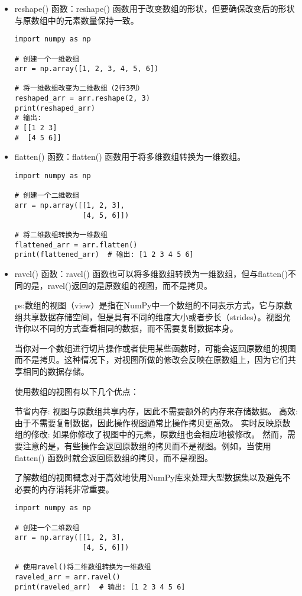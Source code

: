 \documentclass{article}
\begin{document}
\begin{itemize}
    


    \item  reshape() 函数：reshape() 函数用于改变数组的形状，但要确保改变后的形状与原数组中的元素数量保持一致。
\begin{lstlisting}[caption={示例Python代码}]
import numpy as np

# 创建一个一维数组
arr = np.array([1, 2, 3, 4, 5, 6])

# 将一维数组改变为二维数组（2行3列）
reshaped_arr = arr.reshape(2, 3)
print(reshaped_arr)
# 输出:
# [[1 2 3]
#  [4 5 6]]
\end{lstlisting}
\item  flatten() 函数：flatten() 函数用于将多维数组转换为一维数组。
\begin{lstlisting}[caption={示例Python代码}]
import numpy as np

# 创建一个二维数组
arr = np.array([[1, 2, 3],
                [4, 5, 6]])

# 将二维数组转换为一维数组
flattened_arr = arr.flatten()
print(flattened_arr)  # 输出: [1 2 3 4 5 6]
\end{lstlisting}
\item ravel() 函数：ravel() 函数也可以将多维数组转换为一维数组，但与flatten()不同的是，ravel()返回的是原数组的视图，而不是拷贝。
\par ps:数组的视图（view）是指在NumPy中一个数组的不同表示方式，它与原数组共享数据存储空间，但是具有不同的维度大小或者步长（strides）。视图允许你以不同的方式查看相同的数据，而不需要复制数据本身。

当你对一个数组进行切片操作或者使用某些函数时，可能会返回原数组的视图而不是拷贝。这种情况下，对视图所做的修改会反映在原数组上，因为它们共享相同的数据存储。

使用数组的视图有以下几个优点：

节省内存: 视图与原数组共享内存，因此不需要额外的内存来存储数据。
高效: 由于不需要复制数据，因此操作视图通常比操作拷贝更高效。
实时反映原数组的修改: 如果你修改了视图中的元素，原数组也会相应地被修改。
然而，需要注意的是，有些操作会返回原数组的拷贝而不是视图。例如，当使用 flatten() 函数时就会返回原数组的拷贝，而不是视图。

了解数组的视图概念对于高效地使用NumPy库来处理大型数据集以及避免不必要的内存消耗非常重要。
\begin{lstlisting}[caption={示例Python代码}]
import numpy as np

# 创建一个二维数组
arr = np.array([[1, 2, 3],
                [4, 5, 6]])

# 使用ravel()将二维数组转换为一维数组
raveled_arr = arr.ravel()
print(raveled_arr)  # 输出: [1 2 3 4 5 6]
\end{lstlisting}
\end{itemize}
\end{document}
